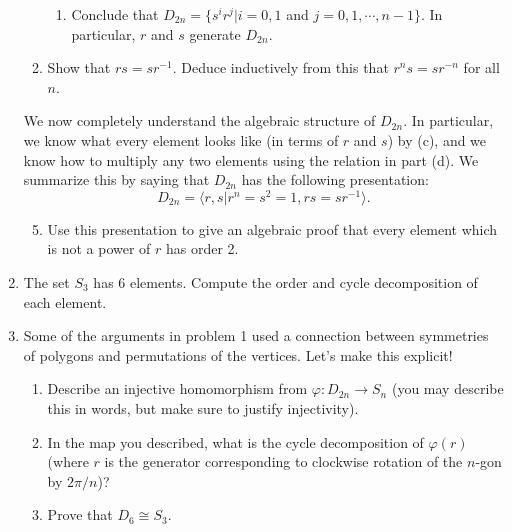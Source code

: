 \documentclass[11pt]{article}
\newcommand{\la}{\langle}
\newcommand{\ra}{\rangle}
\begin{document}
\begin{enumerate}
\begin{enumerate}
{\begin{enumerate}
       \item{
       Conclude that $D_{2n} = \{s^ir^j|i=0,1$ and $j=0,1,\cdots,n-1\}$.  In particular, $r$ and $s$ generate $D_{2n}$.
       }
     \end{enumerate}
     }
     \item{
     Show that $rs = sr^{-1}$.  Deduce inductively from this that $r^ns = sr^{-n}$ for all $n$.
     }
   \end{enumerate}
   We now completely understand the algebraic structure of $D_{2n}$.  In particular, we know what every element looks like (in terms of $r$ and $s$) by (c), and we know how to multiply any two elements using the relation in part (d).  We summarize this by saying that $D_{2n}$ has the following presentation:
   \[D_{2n} = \la r,s | r^n = s^2 = 1, rs = sr^{-1}\ra.\]
   \begin{enumerate}
     \setcounter{enumii}{4}
     \item{
     Use this presentation to give an algebraic proof that every element which is not a power of $r$ has order 2.
    }
   \end{enumerate}
     \item The set $S_3$ has 6 elements.  Compute the order and cycle decomposition of each element.
   \newpage
   \item Some of the arguments in problem 1 used a connection between symmetries of polygons and permutations of the vertices.  Let's make this explicit!
   \begin{enumerate}
    \item Describe an injective homomorphism from $\varphi:D_{2n}\to S_n$ (you may describe this in words, but make sure to justify injectivity).
    \item In the map you described, what is the cycle decomposition of $\varphi(r)$ (where $r$ is the generator corresponding to clockwise rotation of the $n$-gon by $2\pi/n$)?
    \item Prove that $D_6\cong S_3$.
  \end{enumerate}


\end{enumerate}
\end{document}
